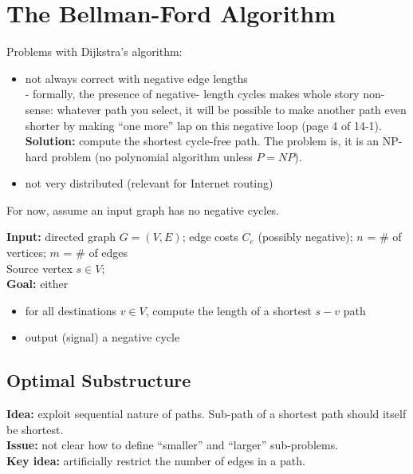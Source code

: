 \documentclass{scrartcl}
\begin{document}
\section{The Bellman-Ford Algorithm}
\label{sec:14-1}
Problems with Dijkstra's algorithm:
\begin{itemize}
\item not always correct with negative edge lengths\\
  - formally, the presence of negative- length cycles makes whole story
  non-sense: whatever path you select, it will be possible to make another path
  even shorter
  by making ``one more'' lap on this negative loop (page 4 of 14-1).\\

  {\bf Solution: } compute the shortest cycle-free path. The problem is, it is
  an NP-hard problem (no polynomial algorithm unless $P=NP$).
\item not very distributed (relevant for Internet routing)
\end{itemize}
For now, assume an input graph has no negative cycles.

{\bf Input: } directed graph $G = (V, E)$; edge costs $C_e$ (possibly negative);
$n$ = \# of vertices; $m$ = \# of edges\\
Source vertex $s \in V$;\\
{\bf Goal: } either
\begin{itemize}
\item for all destinations $v \in V$, compute the length of a shortest $s-v$
  path
\item output (signal) a negative cycle
\end{itemize}

\subsection{Optimal Substructure}
\label{sec:14-2} {\bf Idea: } exploit sequential nature of paths. Sub-path of a
shortest path should itself be shortest.\\
{\bf Issue: } not clear how to define ``smaller'' and ``larger'' sub-problems.\\
{\bf Key idea: } artificially restrict the number of edges in a path.\\
\end{document}
